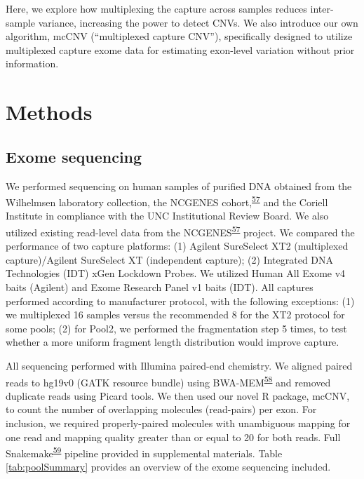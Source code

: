 \documentclass[11pt,letterpaper]{book}
\begin{document}
Here, we explore how multiplexing the capture across samples reduces inter-sample variance, increasing the power to detect CNVs.
We also introduce our own algorithm, mcCNV (``multiplexed capture CNV''), specifically designed to utilize multiplexed capture exome data for estimating exon-level variation without prior information.

\hypertarget{methods}{%
\section{Methods}\label{methods}}

\hypertarget{exome-sequencing}{%
\subsection{Exome sequencing}\label{exome-sequencing}}

We performed sequencing on human samples of purified DNA obtained from the Wilhelmsen laboratory collection, the NCGENES cohort,\textsuperscript{\protect\hyperlink{ref-foreman:2013aa}{57}} and the Coriell Institute in compliance with the UNC Institutional Review Board.
We also utilized existing read-level data from the NCGENES\textsuperscript{\protect\hyperlink{ref-foreman:2013aa}{57}} project.
We compared the performance of two capture platforms: (1) Agilent SureSelect XT2 (multiplexed capture)/Agilent SureSelect XT (independent capture); (2) Integrated DNA Technologies (IDT) xGen Lockdown Probes.
We utilized Human All Exome v4 baits (Agilent) and Exome Research Panel v1 baits (IDT).
All captures performed according to manufacturer protocol, with the following exceptions: (1) we multiplexed 16 samples versus the recommended 8 for the XT2 protocol for some pools; (2) for Pool2, we performed the fragmentation step 5 times, to test whether a more uniform fragment length distribution would improve capture.

All sequencing performed with Illumina paired-end chemistry.
We aligned paired reads to hg19v0 (GATK resource bundle) using BWA-MEM\textsuperscript{\protect\hyperlink{ref-li:2013ab}{58}} and removed duplicate reads using Picard tools.
We then used our novel R package, mcCNV, to count the number of overlapping molecules (read-pairs) per exon.
For inclusion, we required properly-paired molecules with unambiguous mapping for one read and mapping quality greater than or equal to 20 for both reads.
Full Snakemake\textsuperscript{\protect\hyperlink{ref-koster:2012aa}{59}} pipeline provided in supplemental materials.
Table \ref{tab:poolSummary} provides an overview of the exome sequencing included.
\end{document}
